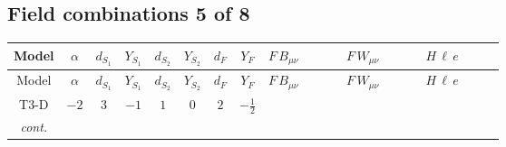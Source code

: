\documentclass[8pt]{article}
\begin{document}
\begin{landscape}
\subsection*{Field combinations 5 of 8}
\begin{longtable}{@{}cccccccc >{\raggedright\arraybackslash}p{0.21\linewidth} >{\raggedright\arraybackslash}p{0.21\linewidth} >{\raggedright\arraybackslash}p{0.21\linewidth}@{}}
\toprule
Model & $\alpha$ & $d_{S_1}$ & $Y_{S_1}$ & $d_{S_2}$ & $Y_{S_2}$ & $d_F$ & $Y_F$ & $F\,B_{\mu\nu}$ & $F\,W_{\mu\nu}$ & $H\,\ell\,e$ \\
\midrule
\endfirsthead
\toprule
Model & $\alpha$ & $d_{S_1}$ & $Y_{S_1}$ & $d_{S_2}$ & $Y_{S_2}$ & $d_F$ & $Y_F$ & $F\,B_{\mu\nu}$ & $F\,W_{\mu\nu}$ & $H\,\ell\,e$ \\
\midrule
\endhead
T3-D & $-2$ & $3$ & $-1$ & $1$ & $0$ & $2$ & $-\frac{1}{2}$ & \scriptsize\adjustbox{max width=\linewidth}{$\begin{gathered} -\frac{1}{2} \hbar  \log \left(\frac{\bar{\mu}^{2}}{M_F^2}\right) B_{\mu _1\mu _2}^2\end{gathered}$} & \scriptsize\adjustbox{max width=\linewidth}{$\begin{gathered} -\frac{1}{2} \hbar  \log \left(\frac{\bar{\mu}^{2}}{M_F^2}\right) \left(W_{\mu _1\mu _2}^{A_1}\right){}^2\end{gathered}$} & \scriptsize\adjustbox{max width=\linewidth}{$\begin{gathered} +\frac{\sqrt{3} \hbar  \overline{y_{1,i_3,r_1}} \overline{L_{a_1,i_2}}\, P_R\, e_{i_1} H_{a_1} y_{1,i_2,r_1} Y_{e,i_3,i_1}}{4 \epsilon } \\ +\frac{3}{8} \sqrt{3} \hbar  \overline{y_{1,i_3,r_1}} \overline{L_{a_1,i_2}}\, P_R\, e_{i_1} H_{a_1} y_{1,i_2,r_1} Y_{e,i_3,i_1} \\ +\frac{\hbar  \overline{y_{2,i_3,r_1}} \overline{L_{a_1,i_2}}\, P_R\, e_{i_1} H_{a_1} y_{2,i_2,r_1} Y_{e,i_3,i_1}}{4 \epsilon }\end{gathered}$} \\
\textit{cont.} &  &  &  &  &  &  &  &  &  & \scriptsize\adjustbox{max width=\linewidth}{$\begin{gathered} +\frac{3}{8} \hbar  \overline{y_{2,i_3,r_1}} \overline{L_{a_1,i_2}}\, P_R\, e_{i_1} H_{a_1} y_{2,i_2,r_1} Y_{e,i_3,i_1} \\ +\frac{\sqrt{3} \hbar  \overline{y_{1,i_1,r_1}} \overline{Y_{e,i_3,i_2}} \overline{e_{i_2}}\, P_L\, L_{a_1,i_1} y_{1,i_3,r_1} H_{a_1}{}^{\dagger }}{4 \epsilon } \\ +\frac{3}{8} \sqrt{3} \hbar  \overline{y_{1,i_1,r_1}} \overline{Y_{e,i_3,i_2}} \overline{e_{i_2}}\, P_L\, L_{a_1,i_1} y_{1,i_3,r_1} H_{a_1}{}^{\dagger }\end{gathered}$} \\

\end{longtable}
\end{landscape}
\end{document}
